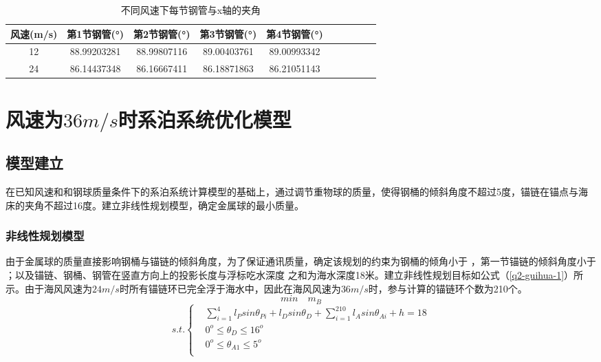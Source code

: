 \documentclass[withoutpreface,bwprint]{cumcmthesis} %
\begin{document}
\begin{table}[!htbp]
\centering
\caption{不同风速下每节钢管与x轴的夹角}
\label{q1-ans-table2}
\begin{tabular}{cccccccccc}
\toprule
风速(m/s)& 第1节钢管(°)& 第2节钢管(°)& 第3节钢管(°)& 第4节钢管(°) \\
\midrule
12 &88.99203281	&88.99807116	&89.00403761	&89.00993342\\
24 &86.14437348	&86.16667411	&86.18871863	&86.21051143\\
\bottomrule 
\end{tabular}
\end{table}

\newpage
\section{风速为$36m/s$时系泊系统优化模型}
\subsection{模型建立}      

\par 在已知风速和和钢球质量条件下的系泊系统计算模型的基础上，通过调节重物球的质量，使得钢桶的倾斜角度不超过5度，锚链在锚点与海床的夹角不超过16度。建立非线性规划模型，确定金属球的最小质量。
\subsubsection{非线性规划模型}
由于金属球的质量直接影响钢桶与锚链的倾斜角度，为了保证通讯质量，确定该规划的约束为钢桶的倾角小于 ，第一节锚链的倾斜角度小于 ；以及锚链、钢桶、钢管在竖直方向上的投影长度与浮标吃水深度 之和为海水深度18米。建立非线性规划目标如公式（\ref{q2-guihua-1}）所示。由于海风风速为$24m/s$时所有锚链环已完全浮于海水中，因此在海风风速为$36m/s$时，参与计算的锚链环个数为210个。
$$
min \quad m_B
$$
\begin{equation}
	\label{q2-guihua-1}
	s.t.\left\{
	\begin{split}
		& \sum\limits_{i=1}^{4} l_P sin\theta_{Pi} + l_D sin\theta_D + \sum\limits_{i=1}^{210} l_A sin \theta_{Ai} + h = 18 \\
		& 0^o \leqslant \theta_D \leqslant 16^o \\
		& 0^o \leqslant \theta_{A1} \leqslant 5^o \\
	\end{split}	
	\right.
\end{equation}
\end{document}

